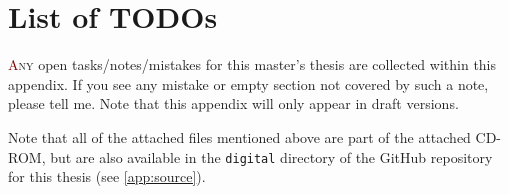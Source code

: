 \documentclass[%
	paper=A4,
	twoside=true,
	openright,
	parskip=half,           %
  11pt,
	chapterprefix=true,     %
	headings=normal,        %
	bibliography=totocnumbered,     %
	titlepage=on,           %
	captions=tableabove,    %
]{scrbook}
\let\listofalgorithms\listoffigures%
\renewcommand{\listoflistings}{%
  \listof{listing}{\listoflistingscaption}%
}
\begin{document}
\makeatletter
\renewcommand\listoffixmes{%
	\chapter{List of TODOs}
	\lettrine[lines=3]{\textcolor{Maroon}{A}}{ny} open tasks/notes/mistakes for this master's thesis are collected within this appendix.
	If you see any mistake or empty section not covered by such a note, please tell me.
	Note that this appendix will only appear in draft versions.

	\@starttoc{lox}%
}
\makeatother


\renewcommand{\glslongextraNameAlign}[0]{r}

\listoffixmes



\renewcommand{\glslongextraNameDescTabularHeader}{
	\toprule
	\glslongextraHeaderFmt{Filename} &
	\glslongextraHeaderFmt\descriptionname\tabularnewline
	\midrule
}

\printglossary[type=main,style={index}]
\printglossary[type=\acronymtype,style={index}]
\setlength{\LTleft}{0pt}
\printunsrtglossary[type=file,style={long-booktabs}]
Note that all of the attached files mentioned above are part of the attached CD-ROM, but are also available in the \texttt{digital} directory of the GitHub repository for this thesis (see \cref{app:source}).

\makeatletter
\renewcommand{\listoffigures}{\section{\listfigurename}\@starttoc{lof}}
\renewcommand{\listoftables}{\section{\listtablename}\@starttoc{lot}}
\renewcommand{\listoflistings}{\section{\lstlistlistingname}\@starttoc{lol}}
\renewcommand{\listofalgorithms}{\section{\listalgorithmname}\@starttoc{loa}}
\makeatother
\end{document}
